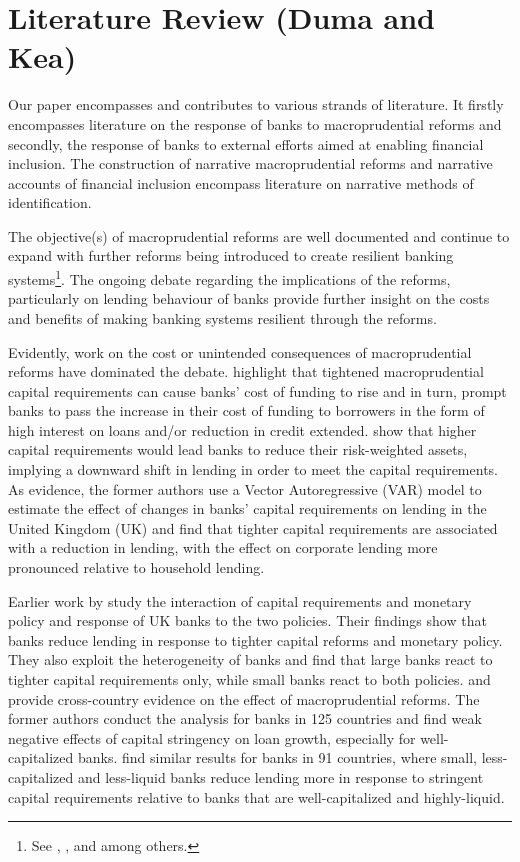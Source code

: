 \documentclass[
  letterpaper,
  DIV=11,
  numbers=noendperiod]{scrartcl}
\begin{document}
\hypertarget{literature-review-duma-and-kea}{%
\section{Literature Review (Duma and
Kea)}\label{literature-review-duma-and-kea}}

Our paper encompasses and contributes to various strands of literature.
It firstly encompasses literature on the response of banks to
macroprudential reforms and secondly, the response of banks to external
efforts aimed at enabling financial inclusion. The construction of
narrative macroprudential reforms and narrative accounts of financial
inclusion encompass literature on narrative methods of identification.

The objective(s) of macroprudential reforms are well documented and
continue to expand with further reforms being introduced to create
resilient banking
systems\footnote{See \cite{kashyap2004cyclical}, \cite{basel06}, \cite{cohen2016banks} and \cite{cerutti2018changes} among others.}.
The ongoing debate regarding the implications of the reforms,
particularly on lending behaviour of banks provide further insight on
the costs and benefits of making banking systems resilient through the
reforms.

Evidently, work on the cost or unintended consequences of
macroprudential reforms have dominated the debate.
\cite{noss2016estimating} highlight that tightened macroprudential
capital requirements can cause banks' cost of funding to rise and in
turn, prompt banks to pass the increase in their cost of funding to
borrowers in the form of high interest on loans and/or reduction in
credit extended. \cite{deli2017real} show that higher capital
requirements would lead banks to reduce their risk-weighted assets,
implying a downward shift in lending in order to meet the capital
requirements. As evidence, the former authors use a Vector
Autoregressive (VAR) model to estimate the effect of changes in banks'
capital requirements on lending in the United Kingdom (UK) and find that
tighter capital requirements are associated with a reduction in lending,
with the effect on corporate lending more pronounced relative to
household lending.

Earlier work by \cite{aiyar2016does} study the interaction of capital
requirements and monetary policy and response of UK banks to the two
policies. Their findings show that banks reduce lending in response to
tighter capital reforms and monetary policy. They also exploit the
heterogeneity of banks and find that large banks react to tighter
capital requirements only, while small banks react to both policies.
\cite{deli2017real} and \cite{mirzaei2022effectiveness} provide
cross-country evidence on the effect of macroprudential reforms. The
former authors conduct the analysis for banks in 125 countries and find
weak negative effects of capital stringency on loan growth, especially
for well-capitalized banks. \cite{mirzaei2022effectiveness} find similar
results for banks in 91 countries, where small, less-capitalized and
less-liquid banks reduce lending more in response to stringent capital
requirements relative to banks that are well-capitalized and
highly-liquid.
\end{document}
